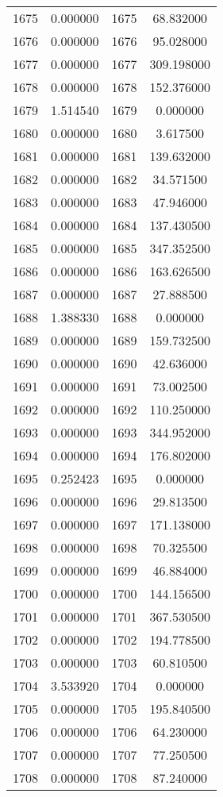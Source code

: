 \documentclass[12pt]{article}
\begin{document}
\begin{longtable}{@{}cccc@{}}
1675 & 0.000000 & 1675 & 68.832000 \\
1676 & 0.000000 & 1676 & 95.028000 \\
1677 & 0.000000 & 1677 & 309.198000 \\
1678 & 0.000000 & 1678 & 152.376000 \\
1679 & 1.514540 & 1679 & 0.000000 \\
1680 & 0.000000 & 1680 & 3.617500 \\
1681 & 0.000000 & 1681 & 139.632000 \\
1682 & 0.000000 & 1682 & 34.571500 \\
1683 & 0.000000 & 1683 & 47.946000 \\
1684 & 0.000000 & 1684 & 137.430500 \\
1685 & 0.000000 & 1685 & 347.352500 \\
1686 & 0.000000 & 1686 & 163.626500 \\
1687 & 0.000000 & 1687 & 27.888500 \\
1688 & 1.388330 & 1688 & 0.000000 \\
1689 & 0.000000 & 1689 & 159.732500 \\
1690 & 0.000000 & 1690 & 42.636000 \\
1691 & 0.000000 & 1691 & 73.002500 \\
1692 & 0.000000 & 1692 & 110.250000 \\
1693 & 0.000000 & 1693 & 344.952000 \\
1694 & 0.000000 & 1694 & 176.802000 \\
1695 & 0.252423 & 1695 & 0.000000 \\
1696 & 0.000000 & 1696 & 29.813500 \\
1697 & 0.000000 & 1697 & 171.138000 \\
1698 & 0.000000 & 1698 & 70.325500 \\
1699 & 0.000000 & 1699 & 46.884000 \\
1700 & 0.000000 & 1700 & 144.156500 \\
1701 & 0.000000 & 1701 & 367.530500 \\
1702 & 0.000000 & 1702 & 194.778500 \\
1703 & 0.000000 & 1703 & 60.810500 \\
1704 & 3.533920 & 1704 & 0.000000 \\
1705 & 0.000000 & 1705 & 195.840500 \\
1706 & 0.000000 & 1706 & 64.230000 \\
1707 & 0.000000 & 1707 & 77.250500 \\
1708 & 0.000000 & 1708 & 87.240000 \\

\end{longtable}
\end{document}

